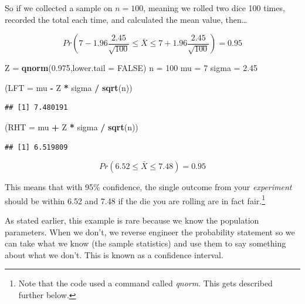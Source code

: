 \documentclass[
]{book}
\newenvironment{Shaded}{\begin{snugshade}}{\end{snugshade}}
\newcommand{\AttributeTok}[1]{\textcolor[rgb]{0.13,0.29,0.53}{#1}}
\newcommand{\ConstantTok}[1]{\textcolor[rgb]{0.56,0.35,0.01}{#1}}
\newcommand{\DecValTok}[1]{\textcolor[rgb]{0.00,0.00,0.81}{#1}}
\newcommand{\FloatTok}[1]{\textcolor[rgb]{0.00,0.00,0.81}{#1}}
\newcommand{\FunctionTok}[1]{\textcolor[rgb]{0.13,0.29,0.53}{\textbf{#1}}}
\newcommand{\NormalTok}[1]{#1}
\newcommand{\OtherTok}[1]{\textcolor[rgb]{0.56,0.35,0.01}{#1}}
\newcommand{\SpecialCharTok}[1]{\textcolor[rgb]{0.81,0.36,0.00}{\textbf{#1}}}
\begin{document}
So if we collected a sample on \(n=100\), meaning we rolled two dice 100 times, recorded the total each time, and calculated the mean value, then\ldots{}

\[Pr\left( 7-1.96 \frac{2.45}{\sqrt{100}} \leq \bar{X} \leq 7+1.96 \frac{2.45}{\sqrt{100}} \right) = 0.95\]

\begin{Shaded}
\begin{Highlighting}[]
\NormalTok{Z }\OtherTok{=} \FunctionTok{qnorm}\NormalTok{(}\FloatTok{0.975}\NormalTok{,}\AttributeTok{lower.tail =} \ConstantTok{FALSE}\NormalTok{)}
\NormalTok{n }\OtherTok{=} \DecValTok{100}
\NormalTok{mu }\OtherTok{=} \DecValTok{7}
\NormalTok{sigma }\OtherTok{=} \FloatTok{2.45}

\NormalTok{(}\AttributeTok{LFT =}\NormalTok{ mu }\SpecialCharTok{{-}}\NormalTok{ Z }\SpecialCharTok{*}\NormalTok{ sigma }\SpecialCharTok{/} \FunctionTok{sqrt}\NormalTok{(n))}
\end{Highlighting}
\end{Shaded}

\begin{verbatim}
## [1] 7.480191
\end{verbatim}

\begin{Shaded}
\begin{Highlighting}[]
\NormalTok{(}\AttributeTok{RHT =}\NormalTok{ mu }\SpecialCharTok{+}\NormalTok{ Z }\SpecialCharTok{*}\NormalTok{ sigma }\SpecialCharTok{/} \FunctionTok{sqrt}\NormalTok{(n))}
\end{Highlighting}
\end{Shaded}

\begin{verbatim}
## [1] 6.519809
\end{verbatim}

\[Pr(6.52 \leq \bar{X} \leq 7.48) = 0.95\]

This means that with 95\% confidence, the single outcome from your \emph{experiment} should be within 6.52 and 7.48 if the die you are rolling are in fact fair.\footnote{Note that the code used a command called \emph{qnorm}. This gets described further below.}

As stated earlier, this example is rare because we know the population parameters. When we don't, we reverse engineer the probability statement so we can take what we know (the sample statistics) and use them to say something about what we don't. This is known as a confidence interval.
\end{document}
